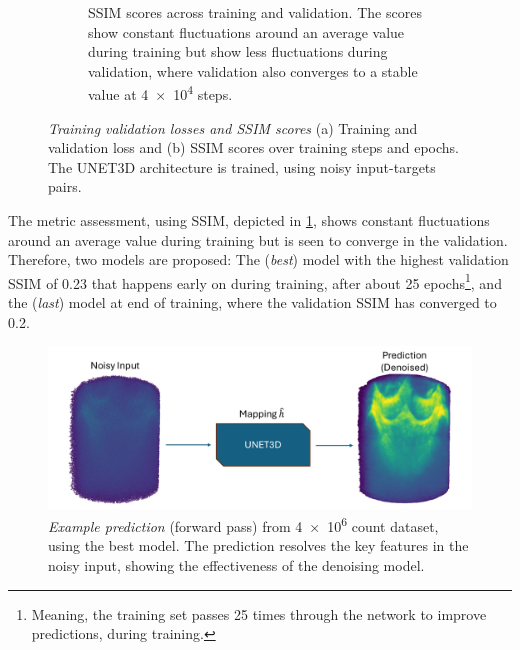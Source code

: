 \begin{figure}
\begin{subfigure}[t]{0.49\linewidth}
        \caption{\gls{SSIM} scores across training and validation. The scores show constant fluctuations around an average value during training but show less fluctuations during validation, where validation also converges to a stable value at \num{4e4} steps.}
        \label{fig:ssim-training-val}
    \end{subfigure}
    \caption{\textit{Training validation losses and SSIM scores} (a) Training and validation loss and (b) \gls{SSIM} scores over training steps and epochs. The UNET3D architecture is trained, using noisy input-targets pairs.}
    \label{fig:loss-ssim-training-val}
\end{figure}

The metric assessment, using \gls{SSIM}, depicted in \cref{fig:ssim-training-val}, shows constant fluctuations around an average value during training but is seen to converge in the validation. Therefore, two models are proposed: The (\textit{best}) model with the highest validation \gls{SSIM} of \num{0.23} that happens early on during training, after about \num{25} epochs\footnote{Meaning, the training set  passes \num{25} times through the network to improve predictions, during training.}, and the (\textit{last}) model at end of training, where the validation \gls{SSIM} has converged to \num{0.2}.

\begin{figure}
    \centering
    \includegraphics[width=1\linewidth]{images/noisy_denoised_3d.pdf}
    \caption{\textit{Example prediction} (forward pass) from \num{4e6} count dataset, using the best model. The prediction resolves the key features in the noisy input, showing the effectiveness of the denoising model.}
    \label{fig:3d-image-noisy-denoised-training}
\end{figure}

